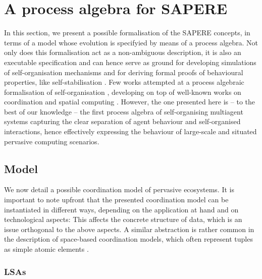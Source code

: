 \documentclass[12pt,a4paper,twoside,openright]{book}
\begin{document}
\section{A process algebra for SAPERE}
\label{sapere-process-algebra}
In this section, we present a possible formalisation of the SAPERE concepts, in terms of a model whose evolution is specifyied by means of a process algebra.
%
Not only does this formalisation act as a non-ambiguous description, it is also an executable specification and can hence serve as ground for developing simulations of self-organisation mechanisms and for deriving formal proofs of behavioural properties, like self-stabilisation \cite{V-SCW2013}.
%
Few works attempted at a process algebraic formalisation of self-organisation \cite{VPB-COORD2012,VDB-FOCLASA-CIC2013}, developing on top of well-known works on coordination and spatial computing \cite{zavattaro2,proto}.
%
However, the one presented here is -- to the best of our knowledge -- the first process algebra of self-organising multiagent systems capturing the clear separation of agent behaviour and self-organised interactions, hence effectively expressing the behaviour of large-scale and situated pervasive computing scenarios.

\subsection{Model}

We now detail a possible coordination model of pervasive ecosystems.
%
It is important to note upfront that the presented coordination model can be instantiated in different ways, depending on the application at hand and on technological aspects: This affects the concrete structure of data, which is an issue orthogonal to the above aspects.
%
A similar abstraction is rather common in the description of space-based coordination models, which often represent tuples as simple atomic elements \cite{zavattaro}.

\subsubsection{LSAs}
\end{document}

